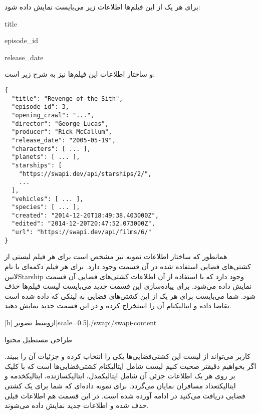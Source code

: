 برای هر یک از این فیلم‌ها اطلاعات زیر می‌بایست نمایش داده شود:

\begin{itemize}\begin{latinitems}
  \item title
  \item episode\_id
  \item release\_date
\end{latinitems}\end{itemize}

و ساختار اطلاعات این فیلم‌ها نیز به شرح زیر است:

\begin{latin}
\begin{verbatim}
{
  "title": "Revenge of the Sith",
  "episode_id": 3,
  "opening_crawl": "...",
  "director": "George Lucas",
  "producer": "Rick McCallum",
  "release_date": "2005-05-19",
  "characters": [ ... ],
  "planets": [ ... ],
  "starships": [
    "https://swapi.dev/api/starships/2/",
    ...
  ],
  "vehicles": [ ... ],
  "species": [ ... ],
  "created": "2014-12-20T18:49:38.403000Z",
  "edited": "2014-12-20T20:47:52.073000Z",
  "url": "https://swapi.dev/api/films/6/"
}
\end{verbatim}
\end{latin}

همانطور که ساختار اطلاعات نمونه نیز مشخص است برای هر فیلم لیستی از کشتی‌های فضایی استفاده شده در آن قسمت وجود دارد.
برای هر فیلم دکمه‌ای با نام ‌لاتین{Starship} وجود دارد که با استفاده از آن اطلاعات کشتی‌های فضایی آن قسمت نمایش داده می‌شود.
برای پیاده‌سازی این قسمت جدید می‌بایست لیست فیلم‌ها حذف شود.
شما می‌بایست برای هر یک از این کشتی‌های فضایی به لینکی که داده شده است تقاضا داده و ‌ایتالیک{نام} آن را استخراج کرده
و در این قسمت جدید نمایش دهید.

[h]
  ‌ازوسط
  ‌تصویر[scale=0.5]{./swapi/swapi-content}
  \caption{طراحی مستطیل محتوا}

کاربر می‌تواند از لیست این کشتی‌فضایی‌ها یکی را انتخاب کرده و جزئیات آن را ببیند.
اگر بخواهیم دقیقتر صحبت کنیم لیست شامل ‌ایتالیک{نام} کشتی‌فضایی‌ها است
که با کلیک بر روی هر یک اطلاعات جزئی آن شامل ‌ایتالیک{مدل}، ‌ایتالیک{سازنده}، ‌ایتالیک{خدمه} و ‌ایتالیک{تعداد مسافران} نمایان می‌گردد.
برای نمونه داده‌ای که شما برای یک کشتی فضایی دریافت می‌کنید در ادامه آورده شده است.
در این قسمت هم اطلاعات قبلی حذف شده و اطلاعات جدید نمایش داده می‌شوند.

